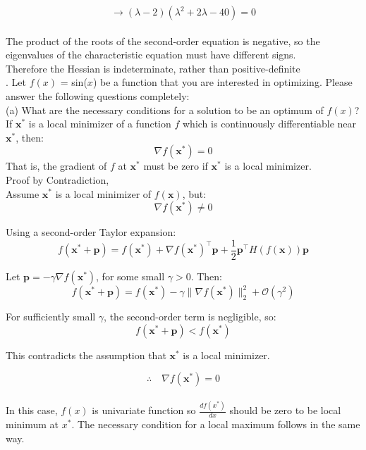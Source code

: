 \documentclass{article} %
\begin{document}
{    \[ \rightarrow (\lambda - 2)(\lambda^2 + 2\lambda -40) = 0 \] \\

    \noindent The product of the roots of the second-order equation is negative,
    so the eigenvalues of the characteristic equation must have different signs. \\
    Therefore the Hessian is indeterminate, rather than positive-definite \\

    . Let $f(x)$ = sin($x$) be a function that you are interested in optimizing. Please answer the following
    questions completely: \\

    \noindent (a) What are the necessary conditions for a solution to be an optimum of $ f(x) $? \\

    \noindent If \( \mathbf{x}^* \) is a local minimizer of a function \( f \) which is continuously differentiable near \( \mathbf{x}^* \), then:
    \[
    \nabla f(\mathbf{x}^*) = 0
    \]
    That is, the gradient of \( f \) at \( \mathbf{x}^* \) must be zero if \( \mathbf{x}^* \) is a local minimizer. \\
    Proof by Contradiction, \\

    Assume \( \mathbf{x}^* \) is a local minimizer of \( f(\mathbf{x}) \), but:
    \[
    \nabla f(\mathbf{x}^*) \neq 0
    \]

    Using a second-order Taylor expansion:
    \[
    f(\mathbf{x}^* + \mathbf{p}) = f(\mathbf{x}^*) + \nabla f(\mathbf{x}^*)^\top \mathbf{p} + \frac{1}{2} \mathbf{p}^\top H(f(\mathbf{x})) \mathbf{p}
    \]

    Let \( \mathbf{p} = -\gamma \nabla f(\mathbf{x}^*) \), for some small \( \gamma > 0 \). Then:
    \[
    f(\mathbf{x}^* + \mathbf{p}) = f(\mathbf{x}^*) - \gamma \| \nabla f(\mathbf{x}^*) \|_2^2 + \mathcal{O}(\gamma^2)
    \]

    For sufficiently small \( \gamma \), the second-order term is negligible, so:
    \[
    f(\mathbf{x}^* + \mathbf{p}) < f(\mathbf{x}^*)
    \]

    This contradicts the assumption that \( \mathbf{x}^* \) is a local minimizer.

    \[
    \therefore \quad \nabla f(\mathbf{x}^*) = 0
    \] \\
    In this case, $ f(x) $ is univariate function so $ \frac{df(x^*)}{dx} $ should be zero to be local minimum at $ x^* $.
    The necessary condition for a local maximum follows in the same way. \\

}
\end{document}
